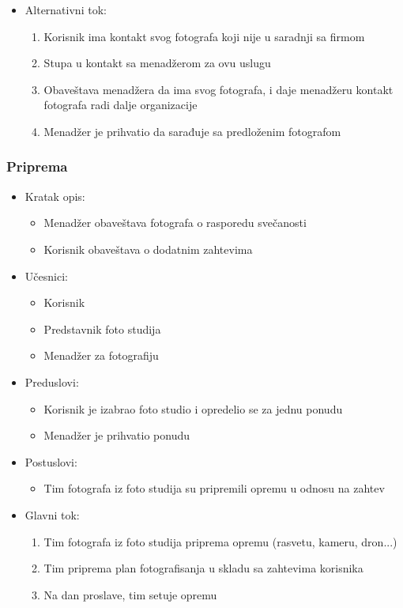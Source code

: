 \documentclass[a4paper]{article}
\begin{document}
\begin{itemize}
    \item Alternativni tok:
        \begin{enumerate}
            \item Korisnik ima kontakt svog fotografa koji nije u saradnji sa firmom
            \item Stupa u kontakt sa menadžerom za ovu uslugu
            \item Obaveštava menadžera da ima svog fotografa, i daje menadžeru kontakt fotografa radi dalje organizacije
            \item Menadžer je prihvatio da sarađuje sa predloženim fotografom
        \end{enumerate}
\end{itemize}

\subsubsection{Priprema}
\begin{itemize}
    \item Kratak opis: 
    \begin{itemize}
        \item Menadžer obaveštava fotografa o rasporedu svečanosti
        \item Korisnik obaveštava o dodatnim zahtevima
    \end{itemize}
    \item Učesnici:
        \begin{itemize}
        \item Korisnik
        \item Predstavnik foto studija
        \item Menadžer za fotografiju
    \end{itemize}
    \item Preduslovi:
        \begin{itemize}
            \item Korisnik je izabrao foto studio i opredelio se za jednu ponudu
            \item Menadžer je prihvatio ponudu
        \end{itemize}
    \item Postuslovi:
        \begin{itemize}
            \item Tim fotografa iz foto studija su pripremili opremu u odnosu na zahtev
        \end{itemize}
    \item Glavni tok:
        \begin{enumerate}
            \item Tim fotografa iz foto studija priprema opremu (rasvetu, kameru, dron...)
            \item Tim priprema plan fotografisanja u skladu sa zahtevima korisnika
            \item Na dan proslave, tim setuje opremu
        \end{enumerate}
\end{itemize}
\end{document}
